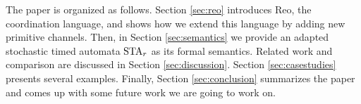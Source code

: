 The paper is organized as follows. Section \ref{sec:reo} introduces Reo, the coordination language, and shows how we extend this language by adding new primitive channels. Then, in Section \ref{sec:semantics} we provide an adapted stochastic timed automata $\mbox{STA}_r$ as its formal semantics. Related work and comparison are discussed in Section \ref{sec:discussion}. Section \ref{sec:casestudies} presents several examples.  Finally, Section \ref{sec:conclusion} summarizes the paper and comes up with some future work we are going to work on.
